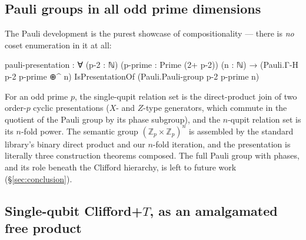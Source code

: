 \subsection{Pauli groups in all odd prime dimensions}\label{sec:pauli}

The Pauli development is the purest showcase of compositionality --- there
is \emph{no} coset enumeration in it at all:

\begin{agdacode}
pauli-presentation :
  ∀ (p-2 : ℕ) (p-prime : Prime (2+ p-2)) (n : ℕ) →
  (Pauli.Γ-H p-2 p-prime ⊕^ n) IsPresentationOf (Pauli.Pauli-group p-2 p-prime n)
\end{agdacode}

For an odd prime $p$, the single-qupit relation set is the direct-product
join of two order-$p$ cyclic presentations ($X$- and $Z$-type generators,
which commute in the quotient of the Pauli group by its phase subgroup),
and the $n$-qupit relation set is its $n$-fold power.  The semantic group
$(\mathbb{Z}_p \times \mathbb{Z}_p)^n$ is assembled by the standard
library's binary direct product and our $n$-fold iteration, and the
presentation is literally three construction theorems composed.  The
full Pauli group with phases, and its role beneath the Clifford
hierarchy, is left to future work (\S\ref{sec:conclusion}).

\subsection{Single-qubit Clifford+$T$, as an amalgamated free product}\label{sec:cliffordt1}

